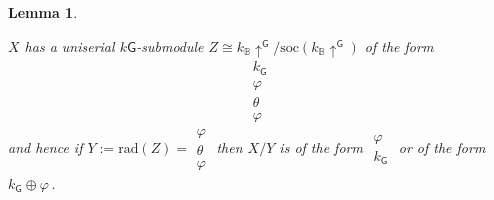 \documentclass[12pt,a4paper]{amsart}
\theoremstyle{plain}\newtheorem{Theorem}{Theorem}[section]
\theoremstyle{plain}\newtheorem{Conjecture}[Theorem]{Conjecture}
\theoremstyle{plain}\newtheorem{Corollary}[Theorem]{Corollary}
\theoremstyle{plain}\newtheorem{Lemma}[Theorem]{Lemma}
\theoremstyle{plain}\newtheorem{Proposition}[Theorem]{Proposition}
\theoremstyle{definition}\newtheorem{Definition}[Theorem]{Definition}
\theoremstyle{definition}\newtheorem{Example}[Theorem]{Example}
\theoremstyle{definition}\newtheorem{Examples}[Theorem]{Examples}
\theoremstyle{definition}\newtheorem{Remark}[Theorem]{Remark}
\theoremstyle{definition}\newtheorem{Question}[Theorem]{Question}
\theoremstyle{definition}\newtheorem{Notation}[Theorem]{Notation}
\theoremstyle{definition}\newtheorem{Hypothesis}[Theorem]{Hypothesis}
\theoremstyle{definition}\newtheorem{Assumption}[Theorem]{Assumption}
\theoremstyle{definition}\newtheorem{Strategy}[Theorem]{Strategy}
\theoremstyle{definition}\newtheorem{Contents}[Theorem]{Contents}
\theoremstyle{definition}\newtheorem{Computations}[Theorem]{Computations}
\theoremstyle{definition}\newtheorem{Equivalences}[Theorem]{Equivalences}
\theoremstyle{definition}\newtheorem{Notation/Definition}[Theorem]{Notation/Definition}
\theoremstyle{definition}\newtheorem{noth}[Theorem]{}
\theoremstyle{plain}\newtheorem{Step}[Theorem]{Step}
\def\rad{\mathrm{rad}}
\def\soc{\mathrm{soc}} \def\tenOS{\otimes_{\mathcal{O}S}} \def\Tr{\mathrm{Tr}}
\begin{document}
\begin{Lemma}
\begin{enumerate}
$X$ has a uniserial $k\mathsf{G}$-submodule $Z\cong k_{\mathbb B}{\uparrow}^\mathsf{G} /\soc(k_{\mathbb B}{\uparrow}^\mathsf{G})$
of the form 
$$
\boxed{
\begin{matrix}
k_\mathsf{G}\\ \varphi\\ \theta\\ \varphi
\end{matrix}
}
$$ 
and hence if $Y:=\rad(Z)=\boxed{
\begin{matrix}
\varphi\\ \theta\\ \varphi
\end{matrix}
}$  then 
$X/Y$ is of the form 
$\boxed{ \begin{matrix} \varphi \\ k_\mathsf{G} \end{matrix}}$ or of the form $k_\mathsf{G}\oplus\varphi$\,.

\end{enumerate}
\end{Lemma}
\end{document}

